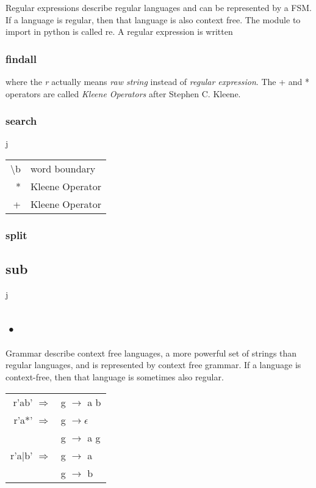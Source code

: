 \documentclass[12pt]{article}
\begin{document}
Regular expressions describe regular languages and can be represented by a FSM.
If a language is regular, then that language is also context free.
The module to import in python is called re. A regular expression is written

\subsubsection{findall}


where the \emph{r} actually means \emph{raw string} instead of \emph{regular expression}. The + and * operators are called \emph{Kleene Operators} after Stephen C. Kleene.

\subsubsection{search}
j

\begin{tabular}{r | l}
	\textbackslash b & word boundary \\
	* & Kleene Operator \\
	+ & Kleene Operator
\end{tabular}

\subsubsection{split}


\subsection{sub}


j\subsection*{•}

Grammar describe context free languages, a more powerful set of strings than regular languages, and is represented by context free grammar. If a language is context-free, then that language is sometimes also regular.

\begin{tabular}{r l}
	r'ab' $\Rightarrow$ & g $\rightarrow$ a b \\
	r'a*' $\Rightarrow$ & g $\rightarrow \epsilon$ \\
	& g $\rightarrow$ a g \\
	r'a$|$b' $\Rightarrow$ & g $\rightarrow$ a \\
	& g $\rightarrow$ b \\	
\end{tabular}
\end{document}
